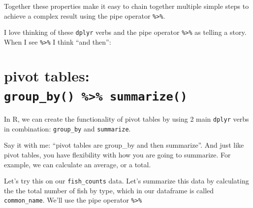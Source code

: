 \documentclass[]{book}
\newenvironment{Shaded}{\begin{snugshade}}{\end{snugshade}}
\newcommand{\CommentTok}[1]{\textcolor[rgb]{0.56,0.35,0.01}{\textit{#1}}}
\newcommand{\DataTypeTok}[1]{\textcolor[rgb]{0.13,0.29,0.53}{#1}}
\newcommand{\KeywordTok}[1]{\textcolor[rgb]{0.13,0.29,0.53}{\textbf{#1}}}
\newcommand{\NormalTok}[1]{#1}
\newcommand{\OperatorTok}[1]{\textcolor[rgb]{0.81,0.36,0.00}{\textbf{#1}}}
\newcommand{\StringTok}[1]{\textcolor[rgb]{0.31,0.60,0.02}{#1}}
\begin{document}
Together these properties make it easy to chain together multiple simple steps to achieve a complex result using the pipe operator \texttt{\%\textgreater{}\%}.

I love thinking of these \texttt{dplyr} verbs and the pipe operator \texttt{\%\textgreater{}\%} as telling a story. When I see \texttt{\%\textgreater{}\%} I think ``and then'':

\begin{Shaded}
\end{Shaded}

\hypertarget{pivot-tables-group_by-summarize}{%
\section{\texorpdfstring{pivot tables: \texttt{group\_by()\ \%\textgreater{}\%\ summarize()}}{pivot tables: group\_by() \%\textgreater{}\% summarize()}}\label{pivot-tables-group_by-summarize}}

In R, we can create the functionality of pivot tables by using 2 main \texttt{dplyr} verbs in combination: \texttt{group\_by} and \texttt{summarize}.

Say it with me: ``pivot tables are group\_by and then summarize''. And just like pivot tables, you have flexibility with how you are going to summarize. For example, we can calculate an average, or a total.

Let's try this on our \texttt{fish\_counts} data. Let's summarize this data by calculating the the total number of fish by type, which in our dataframe is called \texttt{common\_name}. We'll use the pipe operator \texttt{\%\textgreater{}\%}

\begin{Shaded}
\end{Shaded}
\end{document}
